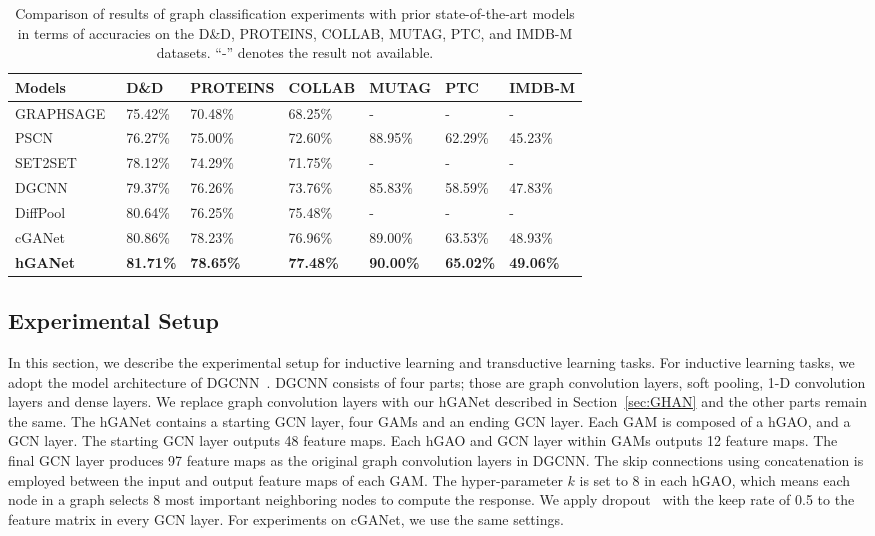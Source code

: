 \documentclass[sigconf]{acmart}
\begin{document}
\begin{table*}[t]
\centering \caption{Comparison of results of graph classification experiments with prior state-of-the-art
models in terms of accuracies on the
D\&D, PROTEINS, COLLAB, MUTAG, PTC, and IMDB-M datasets. ``-'' denotes the result not available.}
\label{table:induc}
\begin{tabularx}{\textwidth}{  X  YYYYYY }
    \hline
    \textbf{Models} & \textbf{D\&D} & \textbf{PROTEINS} & \textbf{COLLAB} & \textbf{MUTAG} & \textbf{PTC} & \textbf{IMDB-M} \\ \hline\hline
    GRAPHSAGE~\cite{hamilton2017inductive}      & 75.42\% & 70.48\%  & 68.25\%  & - & - & -  \\ \hline
    PSCN~\cite{niepert2016learning}             & 76.27\% & 75.00\%  & 72.60\%  & 88.95\% & 62.29\% & 45.23\%  \\ \hline
    SET2SET~\cite{vinyals2015order}             & 78.12\% & 74.29\%  & 71.75\%  & - & - & -  \\ \hline
    DGCNN~\cite{zhang2018end}                   & 79.37\% & 76.26\%  & 73.76\%  & 85.83\% & 58.59\% & 47.83\%  \\ \hline
    DiffPool~\cite{ying2018hierarchical}        & 80.64\% & 76.25\%  & 75.48\%  & - & - & - \\ \hline
    cGANet      & 80.86\% & 78.23\%  & 76.96\%  & 89.00\%  & 63.53\% & 48.93\% \\ \hline
    \textbf{hGANet}                      & \textbf{81.71\%}   & \bf 78.65\% & \bf 77.48\%
                                                & \textbf{90.00\%}   & \textbf{65.02\%} & \textbf{49.06\%} \\ \hline
    \hline
\end{tabularx}
\end{table*}

\subsection{Experimental Setup}\label{sec:expsetup}

In this section, we describe the experimental setup for inductive
learning and transductive learning tasks. For inductive learning
tasks, we adopt the model architecture of DGCNN~\cite{zhang2018end}.
DGCNN consists of four parts; those are graph convolution layers,
soft pooling, 1-D convolution layers and dense layers. We replace
graph convolution layers with our hGANet described in
Section~\ref{sec:GHAN} and the other parts remain the same. The
hGANet contains a starting GCN layer, four GAMs and an ending GCN
layer. Each GAM is composed of a hGAO, and a GCN layer. The starting
GCN layer outputs 48 feature maps. Each hGAO and GCN layer within
GAMs outputs 12 feature maps. The final GCN layer produces 97
feature maps as the original graph convolution layers in DGCNN. The
skip connections using concatenation is employed between the input
and output feature maps of each GAM. The hyper-parameter $k$ is set
to 8 in each hGAO, which means each node in a graph selects 8 most
important neighboring nodes to compute the response. We apply
dropout~\cite{srivastava2014dropout} with the keep rate of 0.5 to
the feature matrix in every GCN layer. For experiments on cGANet,
we use the same settings.
\end{document}
